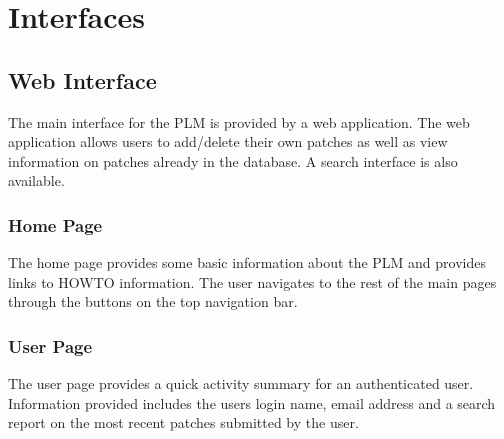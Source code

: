 \section{Interfaces}
\subsection{Web Interface}
The main interface for the PLM is provided by a web application.  The web 
application allows users to add/delete their own patches as well as view 
information on patches already in the database.  A search interface is also 
available.

\subsubsection{Home Page}
The home page provides some basic information about the PLM and provides links to
HOWTO information.  The user navigates to the rest of the main pages through the 
buttons on the top navigation bar.

\begin{center}
\end{center}

\subsubsection{User Page}
The user page provides a quick activity summary for an authenticated user.
Information provided includes the users login name, email address and a search 
report on the most recent patches submitted by the user.

